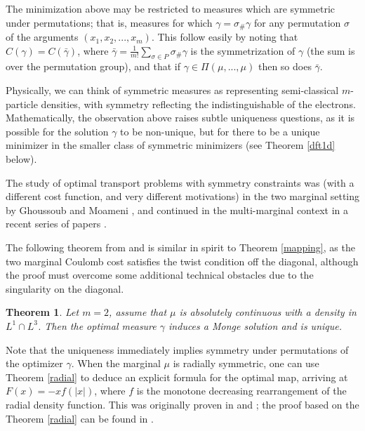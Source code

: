 \documentclass[letter,10pt]{article}
\theoremstyle{dotless}
\begin{document}
\begin{symm}
The minimization above  may be restricted to  measures which are symmetric under permutations; that is, measures for which $\gamma =\sigma_{\#}\gamma$ for any permutation $\sigma$ of the arguments $(x_1,x_2,...,x_m)$.  This follow easily by noting that $C(\gamma) = C(\bar \gamma)$, where  $\bar \gamma =
\frac{1}{m!}\sum_{\sigma \in P}\sigma_{\#} \gamma$ is the symmetrization of $\gamma$ (the sum is over the permutation group), and that if $\gamma \in \Pi(\mu,...,\mu)$ then so does $\bar \gamma$.

Physically, we can think of symmetric measures as representing semi-classical $m$-particle densities, with symmetry reflecting the indistinguishable of the electrons.  Mathematically, the observation above raises subtle uniqueness questions, as it is possible for the solution $\gamma$ to be non-unique, but for there to be a unique minimizer in the smaller class of symmetric minimizers (see Theorem \ref{dft1d} below).

The study of optimal transport problems with symmetry constraints was (with a different cost function, and very different motivations) in the two marginal setting by Ghoussoub and Moameni \cite{GhM2}, and continued in the multi-marginal context  in a recent series of papers \cite{GhM}\cite{GG}\cite{GhMa}.
\end{symm}

The following theorem from \cite{CFK} and \cite{bdpgg} is similar in spirit to Theorem \ref{mapping}, as  the two marginal Coulomb cost satisfies the twist condition off the diagonal, although the proof must overcome some additional technical obstacles due to the singularity on the diagonal.

\newtheorem{dft2marg}[semiclasslim]{Theorem}

\begin{dft2marg}
Let $m=2$, assume that $\mu$ is absolutely continuous with a density in $L^1 \cap L^3$.  Then the optimal measure $\gamma$ induces a Monge solution and is unique.
\end{dft2marg}

Note that the uniqueness immediately implies symmetry under permutations of the optimizer $\gamma$.  When the marginal $\mu$ is radially symmetric, one can use Theorem \ref{radial} to deduce an explicit formula for the optimal map, arriving at $F(x) = -xf(|x|)$, where $f$ is the monotone decreasing rearrangement of the radial density function.  This was originally proven in \cite{CFK} and \cite{bdpgg}; the proof based on the Theorem \ref{radial} can be found in \cite{P13b}.
 
\end{document}
